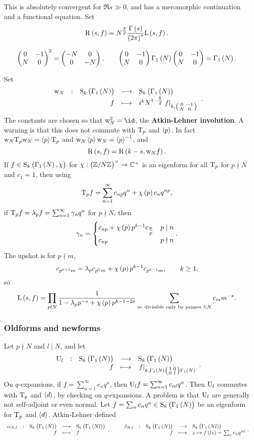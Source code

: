 This is absolutely convergent for $ \Re s \gg 0 $, and has a meromorphic continuation and a functional equation. Set
$$ \R\br{s, f} = N^{\tfrac{s}{2}}\dfrac{\Gamma\br{s}}{\br{2\pi}^s}\L\br{s, f}. $$

\begin{note*}
$$ \twobytwo{0}{-1}{N}{0}^2 = \twobytwo{-N}{0}{0}{-N}, \qquad \twobytwo{0}{-1}{N}{0}\Gamma_1\br{N}\twobytwo{0}{-1}{N}{0} = \Gamma_1\br{N}. $$
\end{note*}

Set
$$ \function[\w_N]{\S_k\br{\Gamma_1\br{N}}}{\S_k\br{\Gamma_1\br{N}}}{f}{i^kN^{1 - \tfrac{k}{2}}\eval{f}_{k, \twobytwosmall{0}{-1}{N}{0}}}. $$
The constants are chosen so that $ \w_N^2 = \id $, the \textbf{Atkin-Lehner involution}. A warning is that this does not commute with $ \mathrm{T}_p $ and $ \left\langle p \right\rangle $. In fact $ \mathrm{w}_N\mathrm{T}_p\mathrm{w}_N = \left\langle p \right\rangle\mathrm{T}_p $ and $ \mathrm{w}_N\left\langle p \right\rangle\mathrm{w}_N = \left\langle p \right\rangle^{-1} $, and
$$ \R\br{s, f} = \R\br{k - s, \w_Nf}. $$
If $ f \in \S_k\br{\Gamma_1\br{N}, \chi} $ for $ \chi : \br{\ZZ / N\ZZ}^\times \to \CC^\times $ is an eigenform for all $ \mathrm{T}_p $ for $ p \nmid N $ and $ c_1 = 1 $, then using
$$ \T_pf = \sum_{n = 1}^\infty c_{np}q^n + \chi\br{p}c_nq^{np}, $$
if $ \mathrm{T}_pf = \lambda_pf = \sum_{n = 1}^\infty \gamma_nq^n $ for $ p \nmid N $, then
$$ \gamma_n =
\begin{cases}
c_{np} + \chi\br{p}p^{k - 1}c_{\tfrac{n}{p}} & p \mid n \\
c_{np} & p \nmid n
\end{cases}.
$$
The upshot is for $ p \nmid m $,
$$ c_{p^{k + 1}m} = \lambda_pc_{p^km} + \chi\br{p}p^{k - 1}c_{p^{k - 1}m}, \qquad k \ge 1, $$
so
$$ \L\br{s, f} = \prod_{p \nmid N} \dfrac{1}{1 - \lambda_pp^{-s} + \chi\br{p}p^{k - 1 - 2s}}\sum_{m \ \text{divisible only by primes} \ l \mid N} c_mm^{-s}. $$

\subsubsection{Oldforms and newforms}


Let $ p \nmid N $ and $ l \mid N $, and let
$$ \function[\U_l]{\S_k\br{\Gamma_1\br{N}}}{\S_k\br{\Gamma_1\br{N}}}{f}{\eval{f}_{k, \Gamma_1\br{N}\twobytwosmall{1}{0}{0}{l}\Gamma_1\br{N}}}. $$
On $ q $-expansions, if $ f = \sum_{n = 1}^\infty c_nq^n $, then $ \mathrm{U}_lf = \sum_{n = 1}^\infty c_{nl}q^n $. Then $ \mathrm{U}_l $ commutes with $ \mathrm{T}_p $ and $ \left\langle d \right\rangle $, by checking on $ q $-expansions. A problem is that $ \mathrm{U}_l $ are generally not self-adjoint or even normal. Let $ f = \sum_n c_nq^n \in \S_k\br{\Gamma_1\br{N}} $ be an eigenform for $ \mathrm{T}_p $ and $ \left\langle d \right\rangle $. Atkin-Lehner defined
$$ \function[\alpha_{N, l}]{\S_k\br{\Gamma_1\br{N}}}{\S_k\br{\Gamma_1\br{Nl}}}{f}{f}, \qquad \function[\beta_{N, l}]{\S_k\br{\Gamma_1\br{N}}}{\S_k\br{\Gamma_1\br{Nl}}}{f}{z \mapsto f\br{lz} = \sum_n c_nq^{nl}}. $$

